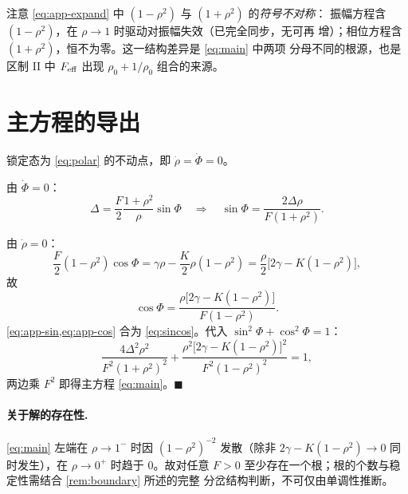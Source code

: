 \begin{remark}
注意 \cref{eq:app-expand} 中 $(1-\rho^2)$ 与 $(1+\rho^2)$ 的\emph{符号不对称}：
振幅方程含 $(1-\rho^2)$，在 $\rho\to1$ 时驱动对振幅失效（已完全同步，无可再
增）；相位方程含 $(1+\rho^2)$，恒不为零。这一结构差异是 \cref{eq:main} 中两项
分母不同的根源，也是区制 II 中 $F_{\mathrm{eff}}$ 出现 $\rho_0+1/\rho_0$ 组合的来源。
\end{remark}

\section{主方程的导出}
\label{app:main}

锁定态为 \cref{eq:polar} 的不动点，即 $\dot\rho=\dot\Phi=0$。

由 $\dot\Phi=0$：
%
\begin{equation}
\Delta=\frac{F}{2}\frac{1+\rho^{2}}{\rho}\sin\Phi
\quad\Longrightarrow\quad
\sin\Phi=\frac{2\Delta\rho}{F(1+\rho^{2})} .
\label{eq:app-sin}
\end{equation}

由 $\dot\rho=0$：
%
\begin{equation}
\frac{F}{2}(1-\rho^{2})\cos\Phi=\gamma\rho-\frac{K}{2}\rho(1-\rho^{2})
=\frac{\rho}{2}\bigl[2\gamma-K(1-\rho^{2})\bigr],
\end{equation}
%
故
%
\begin{equation}
\cos\Phi=\frac{\rho\bigl[2\gamma-K(1-\rho^{2})\bigr]}{F(1-\rho^{2})} .
\label{eq:app-cos}
\end{equation}
%
\cref{eq:app-sin,eq:app-cos} 合为 \cref{eq:sincos}。代入
$\sin^{2}\Phi+\cos^{2}\Phi=1$：
%
\begin{equation}
\frac{4\Delta^{2}\rho^{2}}{F^{2}(1+\rho^{2})^{2}}
+\frac{\rho^{2}\bigl[2\gamma-K(1-\rho^{2})\bigr]^{2}}{F^{2}(1-\rho^{2})^{2}}=1 ,
\end{equation}
%
两边乘 $F^{2}$ 即得主方程 \cref{eq:main}。\hfill$\blacksquare$

\paragraph{关于解的存在性.}
\cref{eq:main} 左端在 $\rho\to1^{-}$ 时因 $(1-\rho^2)^{-2}$ 发散（除非
$2\gamma-K(1-\rho^2)\to0$ 同时发生），在 $\rho\to0^{+}$ 时趋于 $0$。故对任意
$F>0$ 至少存在一个根；根的个数与稳定性需结合 \cref{rem:boundary} 所述的完整
分岔结构判断，不可仅由单调性推断。


